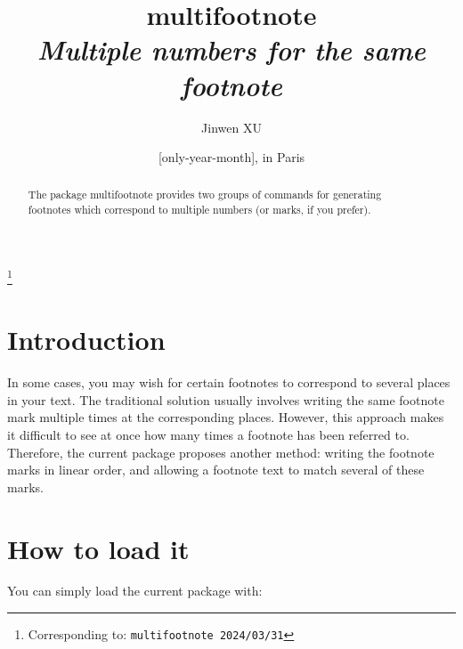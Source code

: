\documentclass[classical]{einfart}
\newcommand{\meta}[1]{$\langle${\normalfont\itshape#1}$\rangle$}
\newcommand{\multifootnotepackage}{{\normalfont\textsf{multifootnote}}}
\begin{document}
\def\PackageVersion{2024/03/31}

\title{\multifootnotepackage{}\\\smallskip\itshape Multiple numbers for the same footnote}
\author{Jinwen XU}
\thanks{Corresponding to: \texttt{\multifootnotepackage{} \PackageVersion}}
\date{\TheDate{\PackageVersion}[only-year-month], in Paris}

\maketitle

\begin{abstract}
    \raggedleft
    The package \multifootnotepackage{} provides two groups of commands for generating\\footnotes which correspond to multiple numbers (or marks, if you prefer).
\end{abstract}


\addtocounter{section}{-1}
\section{Introduction}

In some cases, you may wish for certain footnotes to correspond to several places in your text. The traditional solution usually involves writing the same footnote mark multiple times at the corresponding places. However, this approach makes it difficult to see at once how many times a footnote has been referred to. Therefore, the current package proposes another method: writing the footnote marks in linear order, and allowing a footnote text to match several of these marks.


\section{How to load it}

You can simply load the current package with:

\begin{code}
\usepackage[(*\meta{options}*)]{multifootnote}
\end{code}
\end{document}
